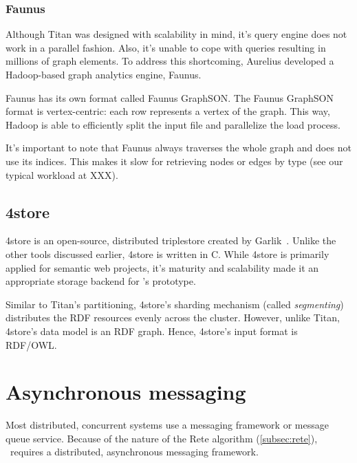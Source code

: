 
\subsubsection{Faunus}

Although Titan was designed with scalability in mind, it's query engine does not work in a parallel fashion. Also, it's unable to cope with queries resulting in millions of graph elements. To address this shortcoming, Aurelius developed a Hadoop-based graph analytics engine, Faunus. %

Faunus has its own format called Faunus GraphSON. The Faunus GraphSON format is vertex-centric: each row represents a vertex of the graph. This way, Hadoop is able to efficiently split the input file and parallelize the load process.


It's important to note that Faunus always traverses the whole graph and does not use its indices. This makes it slow for retrieving nodes or edges by type (see our typical workload at XXX).

\subsection{4store}

4store is an open-source, distributed triplestore created by Garlik~\cite{4store}. Unlike the other tools discussed earlier, 4store is written in C. While 4store is primarily applied for semantic web projects, it's maturity and scalability made it an appropriate storage backend for \iqd's prototype.

Similar to Titan's partitioning, 4store's sharding mechanism (called \emph{segmenting}) distributes the RDF resources evenly across the cluster. However, unlike Titan, 4store's data model is an RDF graph. Hence, 4store's input format is RDF/OWL.


\section{Asynchronous messaging}

Most distributed, concurrent systems use a messaging framework or message queue service. Because of the nature of the Rete algorithm (\ref{subsec:rete}), \iqd\ requires a distributed, asynchronous messaging framework.


